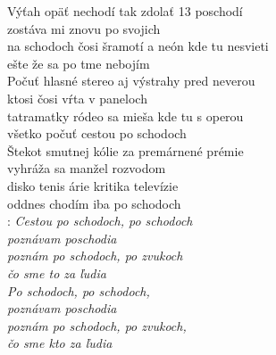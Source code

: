
Výťah opäť nechodí tak zdolať 13 poschodí\\
zostáva mi znovu po svojich\\
na schodoch čosi šramotí a neón kde tu nesvieti\\
ešte že sa po tme nebojím\\

Počuť hlasné stereo aj výstrahy pred neverou\\
ktosi čosi vŕta v paneloch\\
tatramatky ródeo sa mieša kde tu s operou\\
všetko počuť cestou po schodoch\\

Štekot smutnej kólie za premárnené prémie\\
vyhráža sa manžel rozvodom\\
disko tenis árie kritika televízie\\
oddnes chodím iba po schodoch\\

\textregistered: \emph{Cestou po schodoch, po schodoch\\
poznávam poschodia\\
poznám po schodoch, po zvukoch\\
čo sme to za ľudia}\\

\emph{Po schodoch, po schodoch,\\
poznávam poschodia\\
poznám po schodoch, po zvukoch,\\
čo sme kto za ľudia}

\newpage
